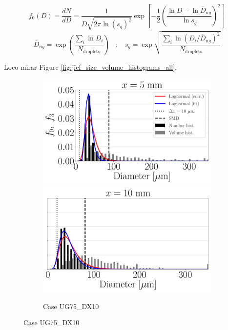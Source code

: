 \begin{equation}
 f_0 \left( D \right) = \frac{d N}{d D} =  \frac{1}{D  \sqrt{2 \pi \ln \left( s_g \right)^2}} \exp \left[ - \frac{1}{2 } \left( \frac{\ln D - \ln \overline{D}_{ng}}{\ln s_g}   \right)^2 \right]
\end{equation}
%
\begin{equation}
\overline{D}_{ng} = \exp \left(  \frac{\sum_i \ln D_i }{N_\mathrm{droplets}} \right)  ~~~~ ; ~~~~ 
s_g = \exp \sqrt{  \frac{\sum_i \ln \left( D_i / \overline{D}_{ng} \right) ^2 }{N_\mathrm{droplets}} }
\end{equation}

Loco mirar Figure \ref{fig:jicf_size_volume_histograms_all}.

\clearpage


\begin{figure}[ht]
\flushleft
\begin{subfigure}[b]{1.1\textwidth}
	\flushleft
   \includegraphics[scale=0.225]{./part2_developments/figures_ch5_resolved_JICF/SPRAY_characterization/histograms_size_volume/UG75_DX10_x05_histograms}
   \includegraphics[scale=0.225]{./part2_developments/figures_ch5_resolved_JICF/SPRAY_characterization/histograms_size_volume/UG75_DX10_x10_histograms}
	\caption{Case UG75\_DX10}
\end{subfigure}


\end{figure}
